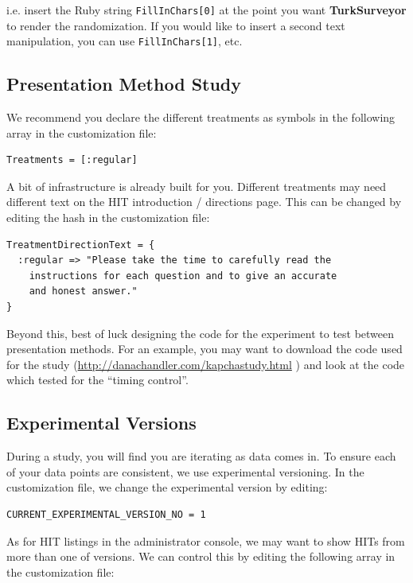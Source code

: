 \documentclass[12pt]{article}
\begin{document}
i.e. insert the Ruby string \texttt{FillInChars[0]} at the point you want \textbf{TurkSurveyor} to render the randomization. If you would like to insert a second text manipulation, you can use \texttt{FillInChars[1]}, etc.





\subsection{Presentation Method Study}

We recommend you declare the different treatments as symbols in the following array in the customization file:

\begin{verbatim}
Treatments = [:regular]
\end{verbatim}

A bit of infrastructure is already built for you. Different treatments may need different text on the HIT introduction / directions page. This can be changed by editing the hash in the customization file:

\begin{verbatim}
TreatmentDirectionText = {
  :regular => "Please take the time to carefully read the
    instructions for each question and to give an accurate 
    and honest answer."
}
\end{verbatim}

Beyond this, best of luck designing the code for the experiment to test between presentation methods. For an example, you may want to download the code used for the \citet{KapelnerChandler2010} study (\href{http://danachandler.com/kapchastudy.html}{http://danachandler.com/kapchastudy.html} ) and look at the code which tested for the ``timing control''.

\subsection{Experimental Versions}

During a study, you will find you are iterating as data comes in. To ensure each of your data points are consistent, we use experimental versioning. In the customization file, we change the experimental version by editing:

\begin{verbatim}
CURRENT_EXPERIMENTAL_VERSION_NO = 1
\end{verbatim}

As for HIT listings in the administrator console, we may want to show HITs from more than one of versions. We can control this by editing the following array in the customization file:
\end{document}
